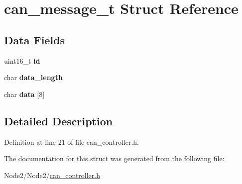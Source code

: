 \hypertarget{structcan__message__t}{}\section{can\+\_\+message\+\_\+t Struct Reference}
\label{structcan__message__t}
\subsection*{Data Fields}
\begin{DoxyCompactItemize}
\item 
\mbox{\label{structcan__message__t_ac5d7e171bc59d6e5ead8957faa1259a6}} 
uint16\+\_\+t {\bfseries id}
\item 
\mbox{\label{structcan__message__t_ab3769058723c86113dc6d4d7c8cf2ec0}} 
char {\bfseries data\+\_\+length}
\item 
\mbox{\label{structcan__message__t_a519019132ffdcd9fe783b12c4f280c57}} 
char {\bfseries data} \mbox{[}8\mbox{]}
\end{DoxyCompactItemize}


\subsection{Detailed Description}


Definition at line 21 of file can\+\_\+controller.\+h.



The documentation for this struct was generated from the following file\+:\begin{DoxyCompactItemize}
\item 
Node2/\+Node2/\hyperlink{can__controller_8h}{can\+\_\+controller.\+h}\end{DoxyCompactItemize}
